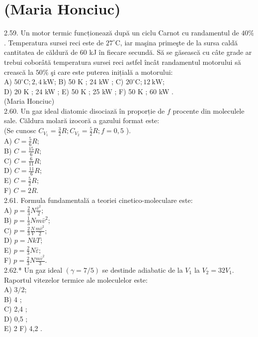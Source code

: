 \documentclass[10pt]{article}
\begin{document}
\section*{(Maria Honciuc)}
2.59. Un motor termic funcționează după un ciclu Carnot cu randamentul de $40 \%$. Temperatura sursei reci este de $27^{\circ} \mathrm{C}$, iar maşina primeşte de la sursa caldă cantitatea de căldură de 60 kJ în fiecare secundă. Să se găsească cu câte grade ar trebui coborâtă temperatura sursei reci astfel încât randamentul motorului să crească la $50 \%$ şi care este puterea inițială a motorului:\\
A) $50^{\circ} \mathrm{C} ; 2,4 \mathrm{~kW}$; B) 50 K ; 24 kW ; C) $20^{\circ} \mathrm{C} ; 12 \mathrm{~kW}$;\\
D) 20 K ; 24 kW ; E) 50 K ; 25 kW ; F) 50 K ; 60 kW .\\
(Maria Honciuc)\\
2.60. Un gaz ideal diatomic disociază în proporție de $f$ procente din moleculele sale. Căldura molară izocoră a gazului format este:\\
(Se cunosc $C_{V_{1}}=\frac{3}{2} R ; C_{V_{2}}=\frac{5}{2} R ; f=0,5$ ).\\
A) $C=\frac{5}{6} R$;\\
B) $C=\frac{15}{6} R$;\\
C) $C=\frac{6}{11} R$;\\
D) $C=\frac{11}{6} R$;\\
E) $C=\frac{5}{2} R$;\\
F) $C=2 R$.\\
2.61. Formula fundamentală a teoriei cinetico-moleculare este:\\
A) $p=\frac{2}{3} N \frac{\bar{v}^{2}}{2}$;\\
B) $p=\frac{1}{3} N m \bar{v}^{2}$;\\
C) $p=\frac{2}{3} \frac{N}{V} \frac{m \bar{v}^{2}}{2}$;\\
D) $p=N k T$;\\
E) $p=\frac{2}{3} N \bar{\varepsilon}$;\\
F) $p=\frac{2}{3} N \frac{m \bar{v}^{2}}{3}$.\\
2.62.* Un gaz ideal $(\gamma=7 / 5)$ se destinde adiabatic de la $V_{1}$ la $V_{2}=32 V_{1}$. Raportul vitezelor termice ale moleculelor este:\\
A) $3 / 2$;\\
B) 4 ;\\
C) 2,4 ;\\
D) 0,5 ;\\
E) 2 F) 4,2 .\\
\end{document}
